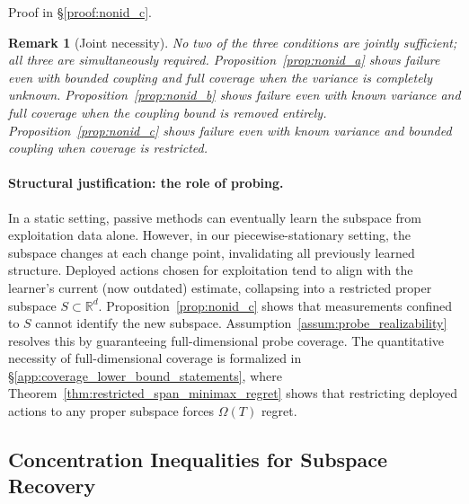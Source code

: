 \documentclass{article}
\newcommand{\R}{\mathbb{R}}
\newtheorem{remark}{Remark}
\begin{document}
Proof in \S\ref{proof:nonid_c}.

\begin{remark}[Joint necessity]
\label{rem:joint_necessity}
No two of the three conditions are jointly sufficient; all three are simultaneously required.
Proposition~\ref{prop:nonid_a} shows failure even with bounded coupling and full coverage when the variance is completely unknown.
Proposition~\ref{prop:nonid_b} shows failure even with known variance and full coverage when the coupling bound is removed entirely.
Proposition~\ref{prop:nonid_c} shows failure even with known variance and bounded coupling when coverage is restricted.
\end{remark}

\paragraph{Structural justification: the role of probing.}
In a static setting, passive methods can eventually learn the subspace from exploitation data alone.
However, in our piecewise-stationary setting, the subspace changes at each change point, invalidating all previously learned structure.
Deployed actions chosen for exploitation tend to align with the learner's current (now outdated) estimate, collapsing into a restricted proper subspace $S \subset \R^d$.
Proposition~\ref{prop:nonid_c} shows that measurements confined to $S$ cannot identify the new subspace.
Assumption~\ref{assum:probe_realizability} resolves this by guaranteeing full-dimensional probe coverage.
The quantitative necessity of full-dimensional coverage is formalized in \S\ref{app:coverage_lower_bound_statements}, where Theorem~\ref{thm:restricted_span_minimax_regret} shows that restricting deployed actions to any proper subspace forces $\Omega(T)$ regret.

\subsection{Concentration Inequalities for Subspace Recovery}
\label{app:concentration}
\end{document}
